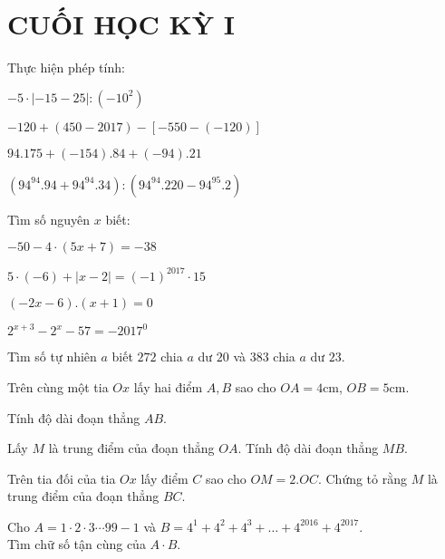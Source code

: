 \section{CUỐI HỌC KỲ I}
\setcounter{ex}{0}
\begin{ex}
	Thực hiện phép tính:
	\begin{listEX}
	\item	$-5\cdot \left| -15-25 \right|:\left( -{{10}^{2}} \right)$ 
\item	$-120+\left( 450-2017 \right)-\left[ -550-\left( -120 \right) \right]$ 
\item	$94.175+\left( -154 \right).84+\left( -94 \right).21$ 
\item	$\left( {{94}^{94}}.94+{{94}^{94}}.34 \right):\left( {{94}^{94}}.220-{{94}^{95}}.2 \right)$ 
	\end{listEX}
\end{ex}
\begin{ex}
	Tìm số nguyên $x$ biết:
	\begin{listEX}[2]
	\item	$-50-4\cdot (5x+7)=-38$
\item	$5\cdot (-6)+\left| x-2 \right|={{(-1)}^{2017}}\cdot 15$ 
\item	$(-2x-6).(x+1)=0$
\item	${{2}^{x+3}}-{{2}^{x}}-57=-{{2017}^{0}}$ 
	\end{listEX}
\end{ex}
\begin{ex}
	Tìm số tự nhiên $a$ biết $272$ chia $a$ dư $20$ và $383$ chia $a$ dư $23$.
\end{ex}
\begin{ex}
	Trên cùng một tia $Ox$ lấy hai điểm $A, B$ sao cho $OA = 4$cm, $OB = 5$cm.
		\begin{listEX}
			\item Tính độ dài đoạn thẳng $AB$.
\item Lấy $M$ là trung điểm của đoạn thẳng $OA$. Tính độ dài đoạn thẳng $MB$.
\item Trên tia đối của tia $Ox$ lấy điểm $C$ sao cho $OM = 2.OC$. Chứng tỏ rằng $M$ là trung điểm của đoạn thẳng $BC$.
		\end{listEX}
\end{ex}
\begin{ex}
	Cho $A=1\cdot 2\cdot 3\cdots 99-1$ và $B={{4}^{1}}+{{4}^{2}}+{{4}^{3}}+\ldots+{{4}^{2016}}+{{4}^{2017}}$.\\
Tìm chữ số tận cùng của $A\cdot B$.
\end{ex}